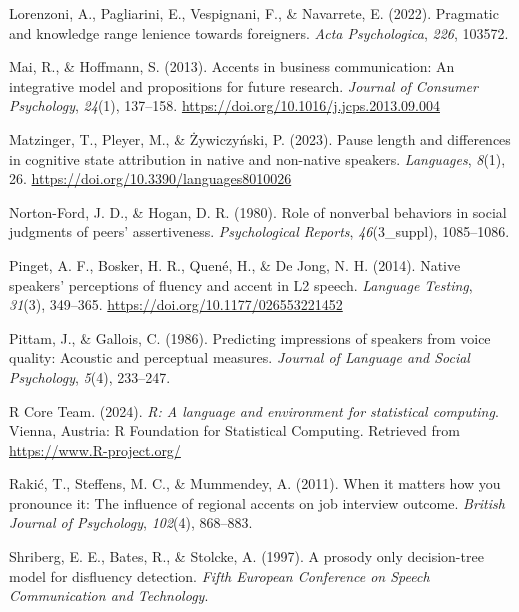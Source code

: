 \documentclass[
  man,floatsintext]{apa6}
\newlength{\cslhangindent}
\newlength{\cslentryspacingunit} %
\newenvironment{CSLReferences}[2] %
 {%
  \setlength{\parindent}{0pt}
  \ifodd #1
  \let\oldpar\par
  \def\par{\hangindent=\cslhangindent\oldpar}
  \fi
  \setlength{\parskip}{#2\cslentryspacingunit}
 }%
 {}
\begin{document}
\begin{CSLReferences}{1}{0}
\leavevmode{}%
Lorenzoni, A., Pagliarini, E., Vespignani, F., \& Navarrete, E. (2022). Pragmatic and knowledge range lenience towards foreigners. \emph{Acta Psychologica}, \emph{226}, 103572.

\leavevmode{}%
Mai, R., \& Hoffmann, S. (2013). Accents in business communication: An integrative model and propositions for future research. \emph{Journal of Consumer Psychology}, \emph{24}(1), 137--158. \url{https://doi.org/10.1016/j.jcps.2013.09.004}

\leavevmode{}%
Matzinger, T., Pleyer, M., \& Żywiczyński, P. (2023). Pause length and differences in cognitive state attribution in native and non-native speakers. \emph{Languages}, \emph{8}(1), 26. \url{https://doi.org/10.3390/languages8010026}

\leavevmode{}%
Norton-Ford, J. D., \& Hogan, D. R. (1980). Role of nonverbal behaviors in social judgments of peers' assertiveness. \emph{Psychological Reports}, \emph{46}(3\_suppl), 1085--1086.

\leavevmode{}%
Pinget, A. F., Bosker, H. R., Quené, H., \& De Jong, N. H. (2014). Native speakers' perceptions of fluency and accent in {L2} speech. \emph{Language Testing}, \emph{31}(3), 349--365. \url{https://doi.org/10.1177/026553221452}

\leavevmode{}%
Pittam, J., \& Gallois, C. (1986). Predicting impressions of speakers from voice quality: Acoustic and perceptual measures. \emph{Journal of Language and Social Psychology}, \emph{5}(4), 233--247.

\leavevmode{}%
R Core Team. (2024). \emph{R: A language and environment for statistical computing}. Vienna, Austria: R Foundation for Statistical Computing. Retrieved from \url{https://www.R-project.org/}

\leavevmode{}%
Rakić, T., Steffens, M. C., \& Mummendey, A. (2011). When it matters how you pronounce it: The influence of regional accents on job interview outcome. \emph{British Journal of Psychology}, \emph{102}(4), 868--883.

\leavevmode{}%
Shriberg, E. E., Bates, R., \& Stolcke, A. (1997). A prosody only decision-tree model for disfluency detection. \emph{Fifth European Conference on Speech Communication and Technology}.


\end{CSLReferences}
\end{document}
